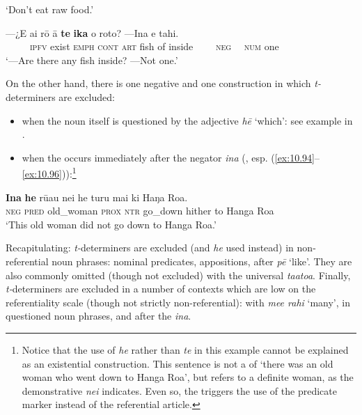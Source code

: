 \glt 
‘Don’t eat raw food.’  
\z

\ea\label{ex:5.40}
\gll —¿E ai rō {\ꞌ}ā \textbf{te} \textbf{ika} o roto? —{\ꞌ}Ina e tahi. \\
~~~~~\textsc{ipfv} exist \textsc{emph} \textsc{cont} \textsc{art} fish of inside ~~~~\textsc{neg~~} \textsc{num} one \\

\glt
‘—Are there any fish inside? —Not one.’ \textstyleExampleref{[R241.058]} 
\z

On the other hand, there is one negative and one  construction in which \textit{t-}determiners are excluded:

\begin{itemize}
\item 
when the noun itself is questioned by the  adjective \textit{hē} ‘which’: see example  in .

\item 
when the  occurs immediately after the negator \textit{{\ꞌ}ina} (, esp. (\ref{ex:10.94}–\ref{ex:10.96})):\footnote{Notice that the use of \textit{he} rather than \textit{te} in this example cannot be explained as an existential construction. This sentence is not a  of ‘there was an old woman who went down to Hanga Roa’, but refers to a definite woman, as the demonstrative \textit{nei} indicates. Even so, the  triggers the use of the predicate marker instead of the referential article.}

\end{itemize}

\ea\label{ex:5.41}
\gll \textbf{{\ꞌ}Ina} \textbf{he} rū{\ꞌ}au nei he turu mai ki Haŋa Roa. \\
\textsc{neg} \textsc{pred} old\_woman \textsc{prox} \textsc{ntr} go\_down hither to Hanga Roa \\

\glt
‘This old woman did not go down to Hanga Roa.’ \textstyleExampleref{[R380.006]} 
\z

Recapitulating: \textit{t-}determiners are excluded (and \textit{he} used instead) in non-referential noun phrases: nominal predicates, appositions, after \textit{p}\textit{ē} ‘like’. They are also commonly omitted (though not excluded) with the universal  \textit{\mbox{ta{\ꞌ}ato{\ꞌ}a}}. Finally, \textit{t-}determin\-ers are excluded in a number of contexts which are low on the referentiality scale (though not strictly non-referential): with \textit{me{\ꞌ}e rahi} ‘many’, in questioned noun phrases, and after the  \textit{{\ꞌ}ina}. 
